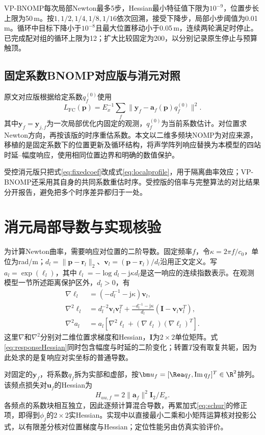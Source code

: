 VP-BNOMP每次局部Newton最多5步，Hessian最小特征值下限为$10^{-9}$，位置步长上限为50\,m。按$1,1/2,1/4,1/8,1/16$依次回溯，接受下降步，局部小步阈值为0.01\,m。循环中目标下降小于$10^{-8}$且最大位置移动小于0.05\,m，连续两轮满足时停止。已完成配对组的循环上限为12；扩大比较固定为200，以分别记录原生停止与预算触顶。

\subsection{固定系数BNOMP对应版与消元对照}
原文对应版根据给定系数$q_f^{(0)}$使用
\begin{equation}
 L_{\mathrm{FC}}(\bm p)=E_x^{-1}\sum_f
 \|\bm y_f-\bm a_f(\bm p)q_f^{(0)}\|^2 .\label{eq:fixedcoef}
\end{equation}
其中$\bm y_f=\bm y_{j,f}$为一次局部优化内固定的观测，$q_f^{(0)}$为当前系数估计。对位置求Newton方向，再按该版的时序重估系数。本文以二维多频块NOMP\cite{Yang2022}为对应来源，移植的是固定系数下的位置更新及循环结构，将声学阵列响应替换为本模型的四站时延--幅度响应，使用相同位置边界和明确的数值保护。

受控消元版只把式\eqref{eq:fixedcoef}改成式\eqref{eq:localprofile}，用于隔离曲率效应；VP-BNOMP还采用其自身的共同系数重估时序。受控版的倍率与完整算法的对比结果分开报告，避免把多个时序差异都归于一处。

\section{消元局部导数与实现核验}\label{app:derivatives}
为计算Newton曲率，需要响应对位置的二阶导数。固定频率$f$，令$\kappa=2\pi f/c_0$，单位为rad/m；$d_l=\|\bm p-\bm r_l\|_2$、$\bm v_l=(\bm p-\bm r_l)/d_l$沿用正文定义。写$a_l=\exp(\ell_l)$，其中$\ell_l=-\log d_l-\mathrm j\kappa d_l$是这一响应的连续指数表示。在观测模型一节所述距离保护区外，$d_l>0$，有
\begin{align}
 \nabla\ell_l&=(-d_l^{-1}-\mathrm j\kappa)\bm v_l,\\
 \nabla^2\ell_l&=d_l^{-2}\bm v_l\bm v_l^T
 +\frac{-d_l^{-1}-\mathrm j\kappa}{d_l}
 (\bm I-\bm v_l\bm v_l^T),\\
 \nabla^2 a_l&=a_l[\nabla^2\ell_l+(\nabla\ell_l)(\nabla\ell_l)^T].\label{eq:responseHessian}
\end{align}
这里$\nabla$和$\nabla^2$分别对二维位置求梯度和Hessian，$\bm I$为$2\times2$单位矩阵。式\eqref{eq:responseHessian}同时包含幅度与时延的二阶变化；转置$T$没有取复共轭，因为此处求的是复响应对实坐标的普通导数。

对固定的$\bm y_f$，将系数$q_f$拆为实部和虚部，按$\bm u_f=[\Rea q_f,\operatorname{Im}q_f]^T\in\R^2$排列。该频点损失对$\bm u_f$的Hessian为
\begin{equation}
 H_{uu,f}=2\|\bm a_f\|^2\bm I_2/E_x .
\end{equation}
各频点的系数块相互独立，因此逐频计算混合导数，再累加式\eqref{eq:schur}的修正项，即得到$\phi_j$的$2\times2$实Hessian。实现中以直接最小二乘和小矩阵运算核对投影公式，以有限差分核对位置梯度与Hessian；定位性能另由仿真实验评价。
